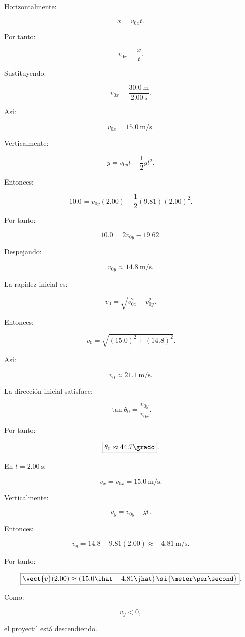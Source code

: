 \begin{explicacion}
Horizontalmente:

\[
x=v_{0x}t.
\]

Por tanto:

\[
v_{0x}
=
\frac{x}{t}.
\]

Sustituyendo:

\[
v_{0x}
=
\frac{\SI{30.0}{\meter}}
{\SI{2.00}{\second}}.
\]

Así:

\[
\boxed{
v_{0x}=\SI{15.0}{\meter\per\second}
}.
\]

Verticalmente:

\[
y
=
v_{0y}t-\frac{1}{2}gt^2.
\]

Entonces:

\[
10.0
=
v_{0y}(2.00)
-
\frac{1}{2}(9.81)(2.00)^2.
\]

Por tanto:

\[
10.0
=
2v_{0y}-19.62.
\]

Despejando:

\[
\boxed{
v_{0y}\approx\SI{14.8}{\meter\per\second}
}.
\]

La rapidez inicial es:

\[
v_0
=
\sqrt{
v_{0x}^2+v_{0y}^2
}.
\]

Entonces:

\[
v_0
=
\sqrt{
(15.0)^2+(14.8)^2
}.
\]

Así:

\[
\boxed{
v_0\approx\SI{21.1}{\meter\per\second}
}.
\]

La dirección inicial satisface:

\[
\tan\theta_0
=
\frac{v_{0y}}{v_{0x}}.
\]

Por tanto:

\[
\boxed{
\theta_0\approx44.7\grado
}.
\]

En \(t=\SI{2.00}{\second}\):

\[
v_x=v_{0x}
=
\SI{15.0}{\meter\per\second}.
\]

Verticalmente:

\[
v_y
=
v_{0y}-gt.
\]

Entonces:

\[
v_y
=
14.8-9.81(2.00)
\approx
-\SI{4.81}{\meter\per\second}.
\]

Por tanto:

\[
\boxed{
\vect{v}(2.00)
\approx
(15.0\ihat-4.81\jhat)
\,\si{\meter\per\second}
}.
\]

Como:

\[
v_y<0,
\]

el proyectil está descendiendo.
\end{explicacion}



